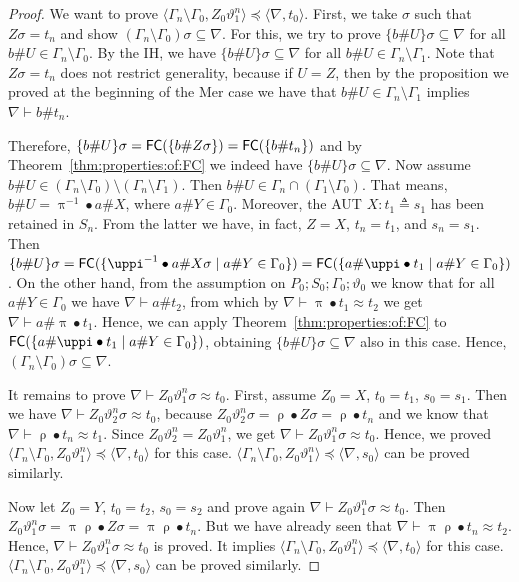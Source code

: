 \documentclass{llncs}
\newcommand{\frN}{\mathfrak N}
\newcommand{\permef}{\bullet}
\newcommand\ppi{\uppi}
\newcommand\prho{\uprho}
\newcommand{\np}[2]{\langle #1, \allowbreak #2\rangle}
\newcommand{\nablag}{\Gamma}
\newcommand{\fe}{{\sf FC}}
\begin{document}
\begin{proof}
We want to prove $\np{\nablag_n\setminus
  \nablag_0}{Z_0\vartheta_1^n}\preceq \np{\nabla}{t_0}$. First, we
take $\sigma$ such that $Z\sigma=t_n$ and show $(\Gamma_n\setminus
\Gamma_0)\sigma\subseteq \nabla$. For this, we try to prove
$\{b\#U\}\sigma \subseteq \nabla$ for all $b\#U\in \Gamma_n\setminus
\Gamma_0$. By the IH, we have $\{b\#U\}\sigma \subseteq \nabla$ for
all $b\#U\in \Gamma_n\setminus \Gamma_1$. Note that $Z\sigma=t_n$ does
not restrict generality, because if $U=Z$, then by the proposition we proved at the beginning of the {\sf Mer} case
we have that $b\#U\in \Gamma_n\setminus \Gamma_1$ implies
$\nabla\vdash b\# t_n$. 

Therefore, $\{b\#U\}\sigma ={\fe}(\{b\#
Z\sigma\}) = {\fe}(\{b\# t_n\})$ and by
Theorem~\ref{thm:properties:of:FC} we indeed have $\{b\#U\}\sigma
\subseteq \nabla$. Now assume $b\#U\in (\Gamma_n \setminus \Gamma_0)
\setminus (\Gamma_n\setminus \Gamma_1)$. Then $b\# U\in \Gamma_n\cap
(\Gamma_1\setminus \Gamma_0)$. That means, $b\# U= \ppi^{-1}\permef a
\# X$, where $a\# Y \in \Gamma_0$. Moreover, the AUT $X:t_1\triangleq
s_1$ has been retained in $S_n$. From the latter we have, in fact,
$Z=X$, $t_n=t_1$, and $s_n=s_1$. Then $\{b\#U\}\sigma =
{\fe}(\{\ppi^{-1}\permef a \# X\sigma \mid a\# Y \in \Gamma_0\}) =
{\fe}(\{a \# \ppi \permef t_1 \mid a\# Y \in \Gamma_0\})$. On the
other hand, from the assumption on $P_0;S_0;\Gamma_0;\vartheta_0$ we know that for all $a \# Y\in
\Gamma_0$ we have $\nabla \vdash a \# t_2$,
from which by $\nabla
\vdash \ppi \permef t_1 \approx t_2$ we get $\nabla \vdash a \# \ppi
\permef t_1$. Hence, we can apply Theorem~\ref{thm:properties:of:FC}
to ${\fe}(\{a \# \ppi \permef t_1 \mid a\# Y \in \Gamma_0\})$,
obtaining $\{b\#U\}\sigma\subseteq \nabla$ also in this case. Hence,
$(\Gamma_n\setminus \Gamma_0)\sigma\subseteq \nabla$.

It remains to prove $\nabla \vdash Z_0\vartheta_1^n\sigma \approx
t_0$. First, assume $Z_0=X$, $t_0=t_1$, $s_0=s_1$. Then we have
$\nabla \vdash Z_0\vartheta_2^n\sigma \approx t_0$, because
$Z_0\vartheta_2^n\sigma = \prho\permef Z\sigma = \prho \permef t_n$
and we know that $\nabla \vdash \prho \permef t_n \approx t_1$. Since
$Z_0\vartheta_2^n=Z_0\vartheta_1^n$, we get $\nabla \vdash
Z_0\vartheta_1^n\sigma \approx t_0$. Hence, we proved
$\np{\nablag_n\setminus \nablag_0}{Z_0\vartheta_1^n}\preceq
\np{\nabla}{t_0}$ for this case. $\np{\nablag_n\setminus
  \nablag_0}{Z_0\vartheta_1^n}\preceq \np{\nabla}{s_0}$ can be proved
similarly.



Now let $Z_0=Y$, $t_0=t_2$, $s_0=s_2$ and prove again $\nabla \vdash
Z_0\vartheta_1^n\sigma \approx t_0$. Then $Z_0\vartheta_1^n\sigma =
\ppi \prho \permef Z \sigma = \ppi \prho \permef
t_n$. But we have already seen that $\nabla \vdash \ppi\prho
\permef t_n \approx t_2$. Hence, $\nabla \vdash Z_0\vartheta_1^n\sigma
\approx t_0$ is proved. It implies $\np{\nablag_n\setminus
  \nablag_0}{Z_0\vartheta_1^n}\preceq \np{\nabla}{t_0}$ for this
case. $\np{\nablag_n\setminus \nablag_0}{Z_0\vartheta_1^n}\preceq
\np{\nabla}{s_0}$ can be proved similarly.
\end{proof}
\end{document}
